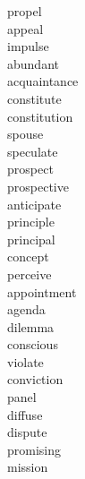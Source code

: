 \documentclass[a4paper, 10pt]{ctexart}
\begin{document}
\begin{multicols*}{2}
\begin{description}
\item[propel]

\item[appeal]

\item[impulse]

\item[abundant]

\item[acquaintance]

\item[constitute]

\item[constitution]

\item[spouse]

\item[speculate]

\item[prospect]

\item[prospective]

\item[anticipate]

\item[principle]

\item[principal]

\item[concept]

\item[perceive]

\item[appointment]

\item[agenda]

\item[dilemma]

\item[conscious]

\item[violate]

\item[conviction]

\item[panel]

\item[diffuse]

\item[dispute]

\item[promising]

\item[mission]


\end{description}
\end{multicols*}
\end{document}
